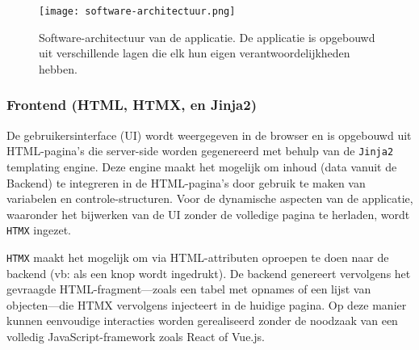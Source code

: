 \begin{figure}[H]
  \centering
  \texttt{[image: software-architectuur.png]}
  \caption[
Software-architectuur van de applicatie
  ]{\label{fig:software-architectuur} Software-architectuur van de applicatie. De applicatie is opgebouwd uit verschillende lagen die elk hun eigen verantwoordelijkheden hebben. }
\end{figure}

\subsubsection{Frontend (HTML, HTMX, en Jinja2)}

De gebruikersinterface (UI) wordt weergegeven in de browser en is opgebouwd uit HTML-pagina's die server-side worden gegenereerd met behulp van de \texttt{Jinja2} templating engine.
Deze engine maakt het mogelijk om inhoud (data vanuit de Backend) te integreren in de HTML-pagina's door gebruik te maken van variabelen en controle-structuren.
Voor de dynamische aspecten van de applicatie, waaronder het bijwerken van de UI zonder de volledige pagina te herladen, wordt \texttt{HTMX} ingezet.

\texttt{HTMX} maakt het mogelijk om via HTML-attributen oproepen te doen naar de backend (vb: als een knop wordt ingedrukt).
De backend genereert vervolgens het gevraagde HTML-fragment---zoals een tabel met opnames of een lijst van objecten---die HTMX vervolgens injecteert in de huidige pagina.
Op deze manier kunnen eenvoudige interacties worden gerealiseerd zonder de noodzaak van een volledig JavaScript-framework zoals React of Vue.js.

